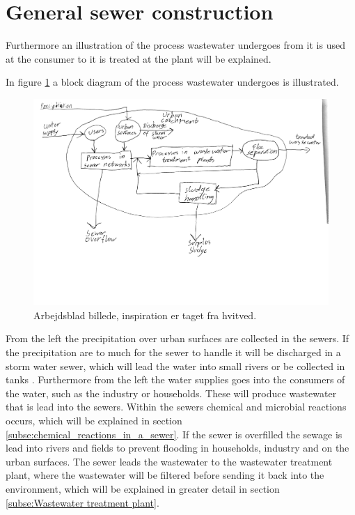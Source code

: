 \section{General sewer construction}\label{se:sewer_construction}
Furthermore an illustration of the process wastewater undergoes from it is used at the consumer to it is treated at the plant will be explained. 

In figure \ref{fig:sewer_overview_of_the_different_parts} a block diagram of the process wastewater undergoes is illustrated.
\begin{figure}[H]
\centering
\includegraphics[width=1\textwidth]{report/introduction/pictures/sewer_process2.pdf}
\caption{Arbejdsblad billede, inspiration er taget fra hvitved.}
\label{fig:sewer_overview_of_the_different_parts}
\end{figure}
From the left the precipitation over urban surfaces are collected in the sewers. If the precipitation are to much for the sewer to handle it will be discharged in a storm water sewer, which will lead the water into small rivers or be collected in tanks . Furthermore from the left the water supplies goes into the consumers of the water, such as the industry or households. These will produce wastewater that is lead into the sewers. Within the sewers chemical and microbial reactions occurs, which will be explained in section \ref{subse:chemical_reactions_in_a_sewer}. If the sewer is overfilled the sewage is lead into rivers and fields to prevent flooding in households, industry and on the urban surfaces. The sewer leads the wastewater to the wastewater treatment plant, where the wastewater will be filtered before sending it back into the environment, which will be explained in greater detail in section \ref{subse:Wastewater treatment plant}. 

